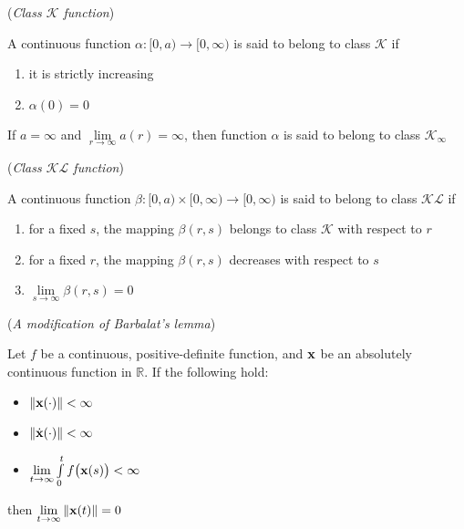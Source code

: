 \begin{bw_box}
\begin{definition}\cite{khalil_nonlinear_systems} (\textit{Class $\mathcal{K}$ function})
\label{def:k_class}

  A continuous function $\alpha : [0, a) \to [0, \infty)$
  is said to belong to class $\mathcal{K}$ if
  \begin{enumerate}
    \item it is strictly increasing
    \item $\alpha (0) = 0$
  \end{enumerate}
  If $a = \infty$ and $\lim\limits_{r \to \infty} a(r) = \infty$, then function
  $\alpha$ is said to belong to class $\mathcal{K}_{\infty}$
\end{definition}
\end{bw_box}

\begin{bw_box}
\begin{definition}\cite{khalil_nonlinear_systems} (\textit{Class $\mathcal{KL}$ function})
\label{def:kl_class}

  A continuous function $\beta : [0, a) \times [0, \infty) \to [0, \infty)$
  is said to belong to class $\mathcal{KL}$ if
  \begin{enumerate}
    \item for a fixed $s$, the mapping $\beta(r,s)$ belongs to class $\mathcal{K}$ with respect to $r$
    \item for a fixed $r$, the mapping $\beta(r,s)$ decreases with respect to $s$
    \item $\lim\limits_{s \to \infty} \beta(r,s) = 0$
  \end{enumerate}
\end{definition}
\end{bw_box}

\begin{bw_box}
  \begin{lemma} (\textit{A modification of Barbalat's lemma}\cite{Fontes2007})
  \label{lemma:barbalat}

    Let $f$ be a continuous, positive-definite function, and $\bm{\mathbf{x}}$ be an
    absolutely continuous function in $\mathbb{R}$. If the following hold:
  \begin{itemize}
    \item $\|\bm{\mathbf{x}}(\cdot)\| < \infty$
    \item $\|\dot{\bm{\mathbf{x}}}(\cdot)\| < \infty$
    \item $\lim\limits_{t \to \infty} \int\limits_0^t f\big(\bm{\mathbf{x}}(s)\big) < \infty$
  \end{itemize}
  then $\lim\limits_{t \to \infty} \|\bm{\mathbf{x}}(t)\| = 0$
  \end{lemma}
\end{bw_box}


